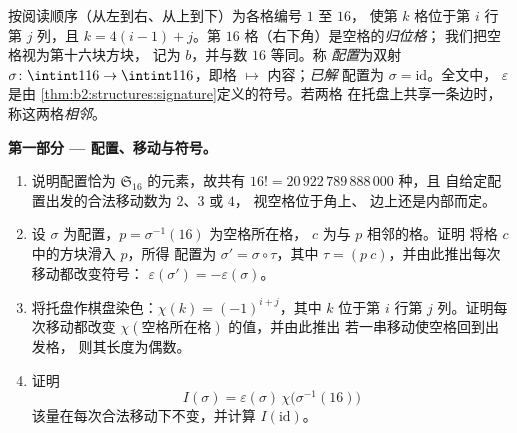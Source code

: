 \begin{problem}
\label{pb:b2:structures:1}
按阅读顺序（从左到右、从上到下）为各格编号 $1$ 至 $16$，
使第 $k$ 格位于第 $i$ 行第 $j$ 列，且 $k
= 4(i - 1) + j$。第 $16$ 格（右下角）是空格的\emph{归位格}；
我们把空格视为第十六块方块，
记为 $b$，并与数 $16$ 等同。称
\emph{配置}为双射 $\sigma \colon \intint1{16}
\to \intint1{16}$，即格 $\mapsto$ 内容；\emph{已解}
配置为 $\sigma = \mathrm{id}$。全文中，
$\varepsilon$ 是由
\cref{thm:b2:structures:signature}定义的符号。若两格
在托盘上共享一条边时，称这两格\emph{相邻}。

\medskip
\noindent\textbf{第一部分 --- 配置、移动与符号。}
\begin{enumerate}
  \item 说明配置恰为
        $\mathfrak{S}_{16}$ 的元素，故共有 $16! =
        20\,922\,789\,888\,000$ 种，且
        自给定配置出发的合法移动数为 $2$、$3$ 或 $4$，
        视空格位于角上、
        边上还是内部而定。
  \item 设 $\sigma$ 为配置，$p = \sigma^{-1}(16)$ 为空格所在格，
        $c$ 为与 $p$ 相邻的格。证明
        将格 $c$ 中的方块滑入 $p$，所得
        配置为 $\sigma' = \sigma \circ \tau$，其中 $\tau =
        (p\ c)$，并由此推出每次移动都改变符号：
        $\varepsilon(\sigma') = -\varepsilon(\sigma)$。
  \item 将托盘作棋盘染色：$\chi(k) = (-1)^{i+j}$，其中
        $k$ 位于第 $i$ 行第 $j$ 列。证明每次移动都改变
        $\chi(\text{空格所在格})$ 的值，并由此推出
        若一串移动使空格回到出发格，
        则其长度为偶数。
  \item 证明
        \[
        I(\sigma) = \varepsilon(\sigma)\,
        \chi\bigl(\sigma^{-1}(16)\bigr)
        \]
        该量在每次合法移动下不变，并计算
        $I(\mathrm{id})$。
\end{enumerate}


\end{problem}
